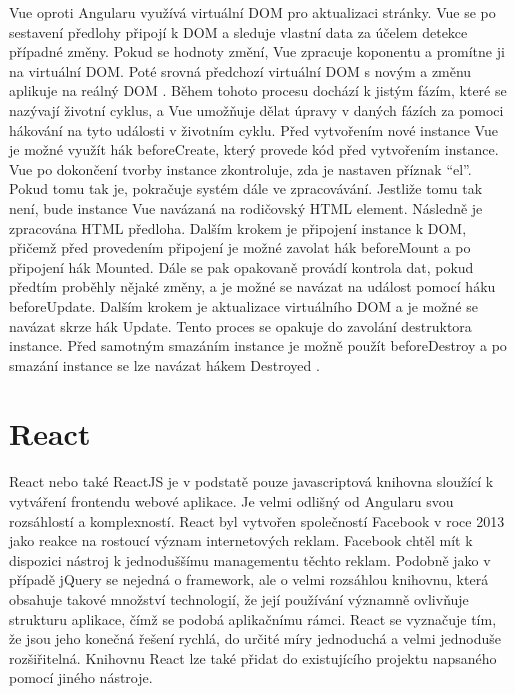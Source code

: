 Vue oproti Angularu využívá virtuální DOM pro aktualizaci stránky. Vue se po sestavení předlohy připojí k DOM a sleduje vlastní data za účelem detekce případné změny. Pokud se hodnoty změní, Vue zpracuje koponentu a promítne ji na virtuální DOM. Poté srovná předchozí virtuální DOM s novým a změnu aplikuje na reálný DOM \cite{vuejsup}. Během tohoto procesu dochází k jistým fázím, které se nazývají životní cyklus, a Vue umožňuje dělat úpravy v daných fázích za pomoci hákování na tyto události v životním cyklu. Před vytvořením nové instance Vue je možné využít hák beforeCreate, který provede kód před vytvořením instance. Vue po dokončení tvorby instance zkontroluje, zda je nastaven příznak “el”. Pokud tomu tak je, pokračuje systém dále ve zpracovávání. Jestliže tomu tak není, bude instance Vue navázaná na rodičovský HTML element. Následně je zpracována HTML předloha. Dalším krokem je připojení instance k DOM, přičemž před provedením připojení je možné zavolat hák beforeMount a po připojení hák Mounted. Dále se pak opakovaně provádí kontrola dat, pokud předtím proběhly nějaké změny, a je možné se navázat na událost pomocí háku beforeUpdate. Dalším krokem je aktualizace virtuálního DOM a je možné se navázat skrze hák Update. Tento proces se opakuje do zavolání destruktora instance. Před samotným smazáním instance je možně použít beforeDestroy a po smazání instance se lze navázat hákem Destroyed \cite{vuelifecycle}.

    \section{React}
React nebo také ReactJS je v podstatě pouze javascriptová knihovna sloužící k vytváření frontendu webové aplikace. Je velmi odlišný od Angularu svou rozsáhlostí a komplexností. React byl vytvořen společností Facebook v roce 2013 jako reakce na rostoucí význam internetových reklam. Facebook chtěl mít k dispozici nástroj k jednoduššímu managementu těchto reklam. Podobně jako v případě jQuery se nejedná o framework, ale o velmi rozsáhlou knihovnu, která obsahuje takové množství technologií, že její používání významně ovlivňuje strukturu aplikace, čímž se podobá aplikačnímu rámci. React se vyznačuje tím, že jsou jeho konečná řešení rychlá, do určité míry jednoduchá a velmi jednoduše rozšiřitelná. Knihovnu React lze také přidat do existujícího projektu napsaného pomocí jiného nástroje. 

